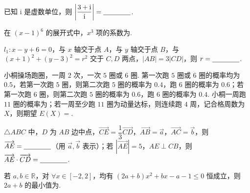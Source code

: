 \documentclass[a4paper,11pt]{report}
\begin{document}
\begin{examquestions}[start=10]
\item 已知 $\mathrm{i}$ 是虚数单位，则 $\left|\dfrac{3+\mathrm{i}}{\mathrm{i}}\right|=\underline{\hspace{1.4cm}}$. 

\item 在 $(x-1)^6$ 的展开式中，$x^3$ 项的系数为\blank. 

\item $l_1:x-y+6=0$，与 $x$ 轴交于点 $A$，与 $y$ 轴交于点 $B$，与 $(x+1)^2+(y-3)^2=r^2$ 交于 $C,D$ 两点，$|AB|=3|CD|$，则 $r=\underline{\hspace{1.4cm}}$. 

\item 小桐操场跑圈，一周 $2$ 次，一次 $5$ 圈或 $6$ 圈. 第一次跑 $5$ 圈或 $6$ 圈的概率均为 $0.5$，若第一次跑 $5$ 圈，则第二次跑 $5$ 圈的概率为 $0.4$，跑 $6$ 圈的概率为 $0.6$；若第一次跑 $6$ 圈，则第二次跑 $5$ 圈的概率为 $0.6$，跑 $6$ 圈的概率为 $0.4$. 小桐一周跑 $11$ 圈的概率为\blank；若一周至少跑 $11$ 圈为动量达标，则连续跑 $4$ 周，记合格周数为 $X$，则期望 $E(X)=$\blank. 

\item $\triangle ABC$ 中，$D$ 为 $AB$ 边中点，$\overrightarrow{CE}=\dfrac13\overrightarrow{CD}$，$\overrightarrow{AB}=\vec a$，$\overrightarrow{AC}=\vec b$，则 $\overrightarrow{AE}=\underline{\hspace{1.4cm}}$（用 $\vec a,\vec b$ 表示）；若 $|\overrightarrow{AE}|=5$，$AE\perp CB$，则 $\overrightarrow{AE}\cdot\overrightarrow{CD}=\underline{\hspace{1.4cm}}$. 

\item 若 $a,b\in\mathbb R$，对 $\forall x\in[-2,2]$，均有 $(2a+b)x^2+bx-a-1\leq0$ 恒成立，则 $2a+b$ 的最小值为\blank. 
\end{examquestions}
\end{document}
